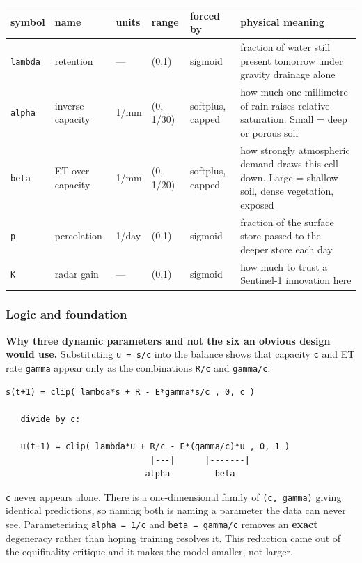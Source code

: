 \documentclass[10pt,a4paper]{article}
\begin{document}
\begin{center}
\footnotesize
\begin{tabularx}{\linewidth}{XXXXXX}
\toprule
\textbf{symbol} & \textbf{name} & \textbf{units} & \textbf{range} & \textbf{forced by} & \textbf{physical meaning} \\
\midrule
\texttt{lambda} & retention & — & (0,1) & sigmoid & fraction of water still present tomorrow under gravity drainage alone \\
\texttt{alpha} & inverse capacity & 1/mm & (0, 1/30) & softplus, capped & how much one millimetre of rain raises relative saturation. Small = deep or porous soil \\
\texttt{beta} & ET over capacity & 1/mm & (0, 1/20) & softplus, capped & how strongly atmospheric demand draws this cell down. Large = shallow soil, dense vegetation, exposed \\
\texttt{p} & percolation & 1/day & (0,1) & sigmoid & fraction of the surface store passed to the deeper store each day \\
\texttt{K} & radar gain & — & (0,1) & sigmoid & how much to trust a Sentinel-1 innovation here \\
\bottomrule
\end{tabularx}
\end{center}

\subsubsection*{Logic and foundation}

\textbf{Why three dynamic parameters and not the six an obvious design would use.}
Substituting \texttt{u = s/c} into the balance shows that capacity \texttt{c} and ET rate
\texttt{gamma} appear only as the combinations \texttt{R/c} and \texttt{gamma/c}:

\begin{Verbatim}[fontsize=\scriptsize,frame=leftline,framerule=0.6pt,rulecolor=\color{rulegray},xleftmargin=6pt,framesep=6pt,]
   s(t+1) = clip( lambda*s + R - E*gamma*s/c , 0, c )

   divide by c:

   u(t+1) = clip( lambda*u + R/c - E*(gamma/c)*u , 0, 1 )
                             |---|      |-------|
                            alpha         beta
\end{Verbatim}

\texttt{c} never appears alone. There is a one-dimensional family of \texttt{(c, gamma)}
giving identical predictions, so naming both is naming a parameter the data can
never see. Parameterising \texttt{alpha = 1/c} and \texttt{beta = gamma/c} removes an \textbf{exact}
degeneracy rather than hoping training resolves it. This reduction came out of
the equifinality critique and it makes the model smaller, not larger.
\end{document}
